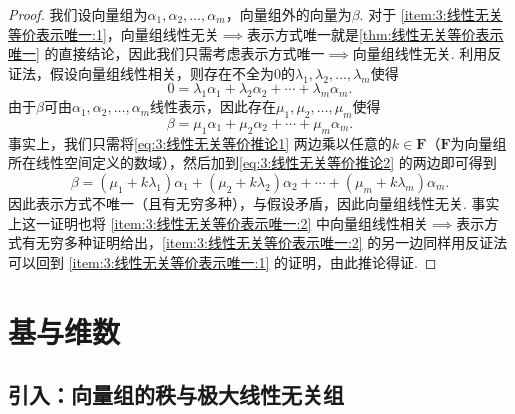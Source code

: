 \begin{enumerate}
          \begin{proof}
              我们设向量组为$\alpha_1,\alpha_2,\ldots,\alpha_m$，向量组外的向量为$\beta$. 对于 \ref*{item:3:线性无关等价表示唯一:1}，向量组线性无关$\implies$表示方式唯一就是\autoref{thm:线性无关等价表示唯一} 的直接结论，因此我们只需考虑表示方式唯一$\implies$向量组线性无关. 利用反证法，假设向量组线性相关，则存在不全为0的$\lambda_1,\lambda_2,\ldots,\lambda_m$使得
              \begin{equation}\label{eq:3:线性无关等价推论1}
                  0=\lambda_1\alpha_1+\lambda_2\alpha_2+\cdots+\lambda_m\alpha_m.
              \end{equation}
              由于$\beta$可由$\alpha_1,\alpha_2,\ldots,\alpha_m$线性表示，因此存在$\mu_1,\mu_2,\ldots,\mu_m$使得
              \begin{equation}\label{eq:3:线性无关等价推论2}
                  \beta=\mu_1\alpha_1+\mu_2\alpha_2+\cdots+\mu_m\alpha_m.
              \end{equation}
              事实上，我们只需将\autoref{eq:3:线性无关等价推论1} 两边乘以任意的$k\in\mathbf{F}$（$\mathbf{F}$为向量组所在线性空间定义的数域），然后加到\autoref{eq:3:线性无关等价推论2} 的两边即可得到
              \[\beta=(\mu_1+k\lambda_1)\alpha_1+(\mu_2+k\lambda_2)\alpha_2+\cdots+(\mu_m+k\lambda_m)\alpha_m.\]
              因此表示方式不唯一（且有无穷多种），与假设矛盾，因此向量组线性无关. 事实上这一证明也将 \ref*{item:3:线性无关等价表示唯一:2} 中向量组线性相关$\implies$表示方式有无穷多种证明给出，\ref*{item:3:线性无关等价表示唯一:2} 的另一边同样用反证法可以回到 \ref*{item:3:线性无关等价表示唯一:1} 的证明，由此推论得证.
          \end{proof}
\end{enumerate}

\section{基与维数}

\subsection{引入：向量组的秩与极大线性无关组}

